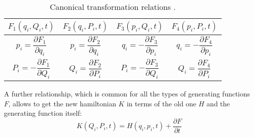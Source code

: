 	\begin{table}[!htb]
	\begin{center}
	\begin{tabular}{|c|c|c|c|}
	\hline 
	\rowcolor{Gray!10}
	$F_1(q_i, Q_i, t)$ & $F_2(q_i, P_i, t)$ & $F_3(p_i, Q_i, t)$ & $F_4(p_i, P_i, t)$ \\ 
	\hline
	\hline 
	$p_i = \dfrac{\partial F_1}{\partial q_i}$ & $p_i = \dfrac{\partial F_2}{\partial q_i}$ & $q_i= -\dfrac{\partial F_3}{\partial p_i}$ & $q_i = -\dfrac{\partial F_4}{\partial p_i}$ 	\\ [10pt]
	\hline 
	$P_i = -\dfrac{\partial F_1}{\partial Q_i}$ & $Q_i = \dfrac{\partial F_2}{\partial P_i}$ & $P_i = - \dfrac{\partial F_3}{\partial Q_i}$ & $Q_i = \dfrac{\partial F_4}{\partial P_i}$ \\ [10pt]
	\hline 
	\end{tabular} 
	\caption{Canonical transformation relations \cite{Wiesel}.}
	\label{tabAppC:Can_table}
	\end{center}
	\end{table}	
	\indent A further relationship, which is common for all the types of generating functions $F$, allows to get the new hamiltonian $K$ in terms of the old one $H$ and the generating function itself:
	\begin{equation}
	\label{eqAppC:Ham_tx}K(Q_i, P_i, t) = H(q_i, p_i, t) + \dfrac{\partial F}{ \partial t}
	\end{equation}
